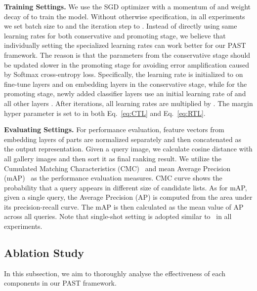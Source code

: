 \documentclass[10pt,twocolumn,letterpaper]{article}
\begin{document}
\textbf{Training Settings.} We use the SGD optimizer with a momentum of  and weight decay of  to train the model. Without otherwise specification, in all experiments we set batch size to  and the iteration step to . 
Instead of directly using same learning rates for both conservative and promoting stage, we believe that individually setting the specialized learning rates can work better for our PAST framework. 
The reason is that the parameters from the conservative stage should be updated slower in the promoting stage for avoiding error amplification caused by Softmax cross-entropy loss. Specifically, the learning rate is initialized to  on fine-tune layers and  on embedding layers in the conservative stage, while for the promoting stage, newly added classifier layers use an initial learning rate of  and all other layers . 
After  iterations, all learning rates are multiplied by . The margin hyper parameter  is set to  in both Eq.~\eqref{eq:CTL} and Eq.~\eqref{eq:RTL}.

\textbf{Evaluating Settings.} For performance evaluation, feature vectors from embedding layers of  parts are normalized separately and then concatenated as the output representation. Given a query image, we calculate cosine distance with all gallery images and then sort it as final ranking result. We utilize the Cumulated Matching Characteristics (CMC)~\cite{CMC} and mean Average Precision (mAP)~\cite{market1501} as the performance evaluation measures. CMC curve shows the probability that a query appears in different size of candidate lists. As for mAP, given a single query, the Average Precision (AP) is computed from the area under its precision-recall curve. The mAP is then calculated as the mean value of AP across all queries. Note that single-shot setting is adopted similar to~\cite{PCB} in all experiments. 

\subsection{Ablation Study}
In this subsection, we aim to thoroughly analyse the effectiveness of each components in our PAST framework.
\end{document}
